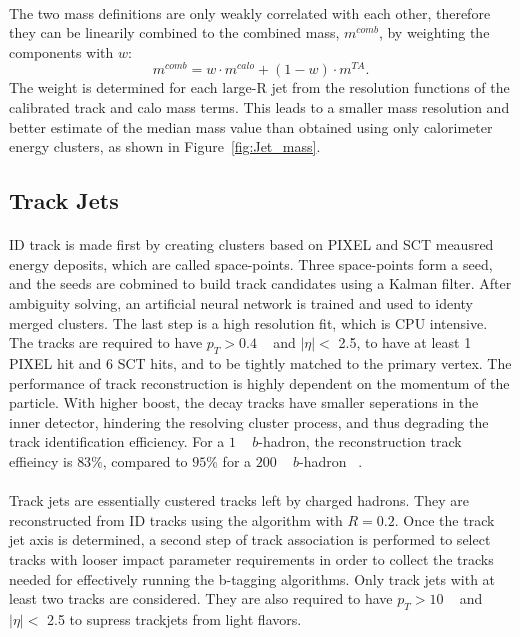 \paragraph{}
The two mass definitions are only weakly correlated with each other, therefore they can be linearily combined to the combined mass, $m^{comb}$, by weighting the components with $w$:
\begin{equation}
m^{comb} = w\cdot m^{calo}+(1-w)\cdot m^{TA}.
\end{equation}
The weight is determined for each large-R jet from the resolution functions of the calibrated track and calo mass terms.
This leads to a smaller mass resolution and better estimate of the median mass value than obtained using only calorimeter energy clusters, as shown in Figure~\ref{fig:Jet_mass}.

\subsection{Track Jets}
\paragraph{}
ID track is made first by creating clusters based on PIXEL and SCT meausred energy deposits, which are called space-points. 
Three space-points form a seed, and the seeds are cobmined to build track candidates using a Kalman filter. 
After ambiguity solving, an artificial neural network is trained and used to identy merged clusters. 
The last step is a high resolution fit, which is CPU intensive. 
The tracks are required to have $p_T > 0.4$ \GeV~ and $|\eta| <$ 2.5, to have at least 1 PIXEL hit and 6 SCT hits, and to be tightly matched to the primary vertex. 
The performance of track reconstruction is highly dependent on the momentum of the particle. 
With higher boost, the decay tracks have smaller seperations in the inner detector, hindering the resolving cluster process, and thus degrading the track identification efficiency. 
For a $1$ \TeV~ $b$-hadron, the reconstruction track effieincy is $83\%$, compared to $95\%$ for a $200$ \GeV~ $b$-hadron ~\cite{Aaboud:2017all}.

\paragraph{}
Track jets are essentially custered tracks left by charged hadrons. 
They are reconstructed from ID tracks using the \akt algorithm with $R=0.2$. 
Once the track jet axis is determined, a second step of track association is performed to select tracks with looser impact parameter requirements in order to collect the tracks needed for effectively running the b-tagging algorithms.
Only track jets with at least two tracks are considered.
They are also required to have $p_T > 10$ \GeV~ and $|\eta| <$ 2.5 to supress trackjets from light flavors.

